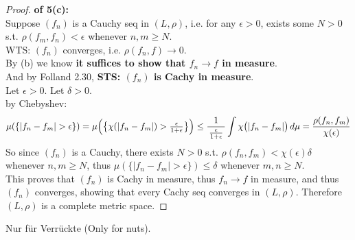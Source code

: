 \documentclass[lang=cn,11pt]{elegantbook}
\begin{document}
\begin{proof}
   \textbf{ of 5(c): }\\
   Suppose $(f_n)$ is a Cauchy seq in $(L,\rho)$, i.e. for any $\epsilon > 0$, exists some $N>0$ s.t. \(\rho(f_m, f_n)  < \epsilon\) whenever $n,m \geq N$.\\
   WTS: $(f_n)$ converges, i.e. $\rho(f_n,f)\to0$. \\
By (b) we know \textbf{it suffices to show that $f_n\to f$ in measure}.\\
And by Folland 2.30, \textbf{ STS: $(f_n)$ is Cachy in measure}.\\
Let $\epsilon > 0$. Let $\delta > 0$.\\
by Chebyshev:\[
 \mu(  \{|f_n-f_m| > \epsilon\} ) =    \mu\Bigl(\bigl\{\chi(|f_n-f_m|)>\tfrac{\epsilon}{1+\epsilon}\bigr\}\Bigr) \leq 
    \frac{1}{\,\tfrac{\epsilon}{1+\epsilon}\,}
    \int\chi\bigl(|f_n-f_m|\bigr)\,d\mu =  \frac{\rho(f_n,f_m)}{\chi(\epsilon)}
  \]
So since $(f_n)$ is a Cauchy, there exists $N > 0$ s.t. $\rho(f_n,f_m) < \chi(\epsilon) \delta$ whenever $n,m \geq N$, thus  $ \mu(  \{|f_n-f_m| > \epsilon\} ) \leq \delta$ whenever $m,n \geq N$.\\
This proves that $(f_n)$ is Cachy in measure, thus $f_n\to f$ in measure, and thus $(f_n)$ converges, showing that every Cachy seq converges in $(L,\rho)$. Therefore $(L,\rho)$ is a complete metric space. 
\end{proof}





\begin{center}
    Nur f\"ur Verr\"uckte (Only for nuts).
\end{center}
\end{document}
